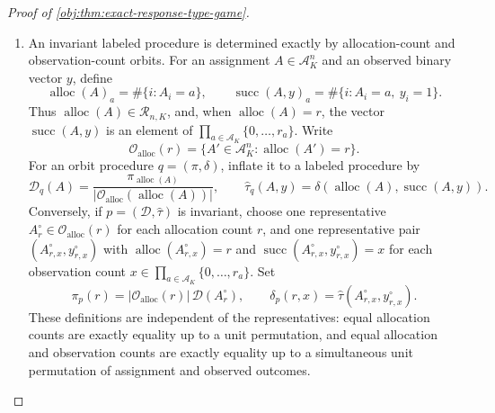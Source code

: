 \begin{proof}[Proof of \cref{obj:thm:exact-response-type-game}]
\begin{enumerate}
\item An invariant labeled procedure is determined exactly by allocation-count and observation-count orbits.  For an assignment \(A\in\mathcal A_K^n\) and an observed binary vector \(y\), define
\[
\operatorname{alloc}(A)_a=\#\{i:A_i=a\},
\qquad
\operatorname{succ}(A,y)_a=\#\{i:A_i=a,\ y_i=1\}.
\]
Thus \(\operatorname{alloc}(A)\in\mathcal R_{n,K}\), and, when \(\operatorname{alloc}(A)=r\), the vector \(\operatorname{succ}(A,y)\) is an element of \(\prod_{a\in\mathcal A_K}\{0,\ldots,r_a\}\).  Write
\[
\mathcal O_{\mathrm{alloc}}(r)
=
\{A'\in\mathcal A_K^n:\operatorname{alloc}(A')=r\}.
\]
For an orbit procedure \(q=(\pi,\delta)\), inflate it to a labeled procedure by
\[
\mathcal D_q(A)=
\frac{\pi_{\operatorname{alloc}(A)}}{
|\mathcal O_{\mathrm{alloc}}(\operatorname{alloc}(A))|},
\qquad
\widehat\tau_q(A,y)=
\delta(\operatorname{alloc}(A),\operatorname{succ}(A,y)).
\]
Conversely, if \(p=(\mathcal D,\widehat\tau)\) is invariant, choose one representative \(A_r^\circ\in\mathcal O_{\mathrm{alloc}}(r)\) for each allocation count \(r\), and one representative pair \((A_{r,x}^\circ,y_{r,x}^\circ)\) with \(\operatorname{alloc}(A_{r,x}^\circ)=r\) and \(\operatorname{succ}(A_{r,x}^\circ,y_{r,x}^\circ)=x\) for each observation count \(x\in\prod_{a\in\mathcal A_K}\{0,\ldots,r_a\}\).  Set
\[
\pi_p(r)=
|\mathcal O_{\mathrm{alloc}}(r)|\,\mathcal D(A_r^\circ),
\qquad
\delta_p(r,x)=\widehat\tau(A_{r,x}^\circ,y_{r,x}^\circ).
\]
These definitions are independent of the representatives: equal allocation counts are exactly equality up to a unit permutation, and equal allocation and observation counts are exactly equality up to a simultaneous unit permutation of assignment and observed outcomes.


\end{enumerate}
\end{proof}

